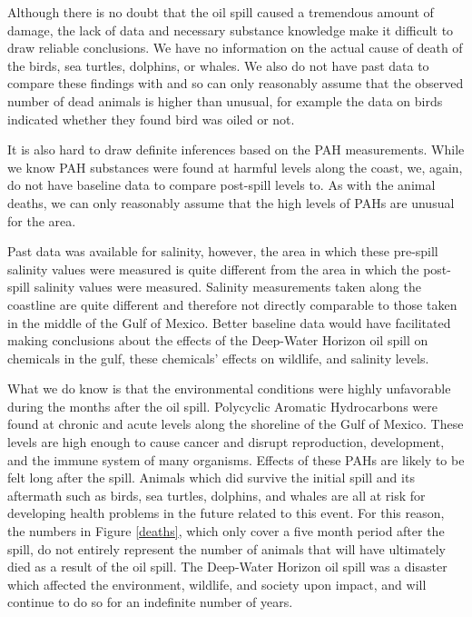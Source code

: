 \documentclass[authoryear,12pt]{elsarticle}
\begin{document}
Although there is no doubt that the oil spill caused a tremendous amount of damage, the lack of data  {and necessary substance knowledge} make it difficult to draw  {reliable} conclusions. We have no information on the actual cause of death of the birds, sea turtles, dolphins,  {or} whales.  We also do not have past data to compare these findings with and so can only reasonably assume that th{e observed} number of dead animals is  {higher than} unusual, {for example the data on birds indicated whether they found bird was oiled or not.} %

It is also hard to  {draw} definite inferences based on the PAH measurements.  While we know PAH substances were found at harmful levels along the coast, we{, again,} do not have baseline data to compare post-spill levels to. As with the animal deaths, we can only reasonably assume that the high levels of PAHs are unusual for the area. 

Past data was available for salinity, however, the area in which these pre-spill salinity values were measured is quite different from the area in which the post-spill salinity values were measured.  Salinity measurements taken along the coastline  {are} quite different and therefore not directly comparable to those taken in the middle of the Gulf of Mexico. Better baseline data would have facilitated making conclusions about the effects of the Deep-Water Horizon oil spill on chemicals in the gulf, these chemicals' effects on wildlife, and salinity levels.

What we do know is that the environmental conditions were highly unfavorable during the months after the oil spill. Polycyclic Aromatic Hydrocarbons were found at chronic and acute levels along the shoreline of the Gulf of Mexico. These levels are high enough to cause cancer and disrupt reproduction, development, and the immune system of  {many} organisms. Effects of these PAHs are likely to be felt long after the spill. Animals which did survive the initial spill and its aftermath such as birds, sea turtles, dolphins, and whales are all at risk  {for developing} health problems in the future  {related to this event.} For this reason, the numbers in Figure \ref{deaths}, which only cover a five month period after the spill, do not entirely represent the number of animals that will have ultimately died as a result of the oil spill. The Deep-Water Horizon oil spill was a disaster which affected the environment, wildlife, and society upon impact, and will continue to do so for an indefinite number of years.
\end{document}
